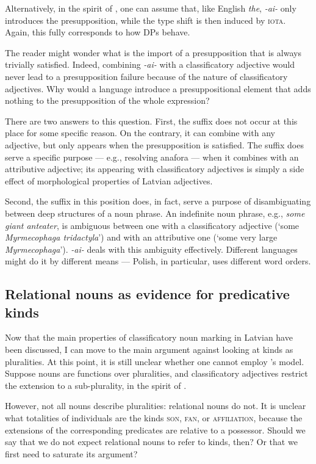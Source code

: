 \documentclass[a4paper, 12pt]{article}
\begin{document}
Alternatively, in the spirit of \textcite{coppock2015definitenessdeterminacy}, one can assume that, like English \textit{the}, \textit{-ai-} only introduces the presupposition, while the type shift is then induced by \textsc{iota}. Again, this fully corresponds to how DPs behave.

The reader might wonder what is the import of a presupposition that is always trivially satisfied. Indeed, combining \textit{-ai-} with a classificatory adjective would never lead to a presupposition failure because of the nature of classificatory adjectives. Why would a language introduce a presuppositional element that adds nothing to the presupposition of the whole expression?

There are two answers to this question. First, the suffix does not occur at this place for some specific reason. On the contrary, it can combine with any adjective, but only appears when the presupposition is satisfied. The suffix does serve a specific purpose --- e.g., resolving anafora --- when it combines with an attributive adjective; its appearing with classificatory adjectives is simply a side effect of morphological properties of Latvian adjectives.

Second, the suffix in this position does, in fact, serve a purpose of disambiguating between deep structures of a noun phrase. An indefinite noun phrase, e.g., \textit{some giant anteater}, is ambiguous between one with a classificatory adjective (`some \textit{Myrmecophaga tridactyla}') and with an attributive one (`some very large \textit{Myrmecophaga}'). \textit{-ai-} deals with this ambiguity effectively. Different languages might do it by different means --- Polish, in particular, uses different word orders.

\subsection{Relational nouns as evidence for predicative kinds}\label{reln}

Now that the main properties of classificatory noun marking in Latvian have been discussed,  I can move to the main argument against looking at kinds as pluralities. At this point, it is still unclear whether one cannot employ \textcite{chierchia1998referencekindslanguages}'s model. Suppose nouns are functions over pluralities, and classificatory adjectives restrict the extension to a sub-plurality, in the spirit of \textcite{mendia2019referenceadhoc}.

However, not all nouns describe pluralities: relational nouns do not. It is unclear what totalities of individuals are the kinds \textsc{son}, \textsc{fan}, or \textsc{affiliation}, because the extensions of the corresponding predicates are relative to a possessor. Should we say that we do not expect relational nouns to refer to kinds, then? Or that we first need to saturate its argument?
\end{document}
